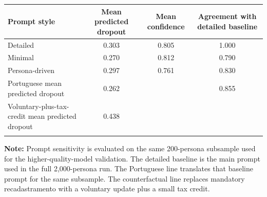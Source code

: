 \begin{tabular*}{\textwidth}{@{\extracolsep{\fill}}lccc}
\doubletoprule
Prompt style & Mean predicted dropout & Mean confidence & Agreement with detailed baseline \\
\midrule
Detailed & 0.303 & 0.805 & 1.000 \\
Minimal & 0.270 & 0.812 & 0.790 \\
Persona-driven & 0.297 & 0.761 & 0.830 \\
\midrule
Portuguese mean predicted dropout & 0.262 &  & 0.855 \\
Voluntary-plus-tax-credit mean predicted dropout & 0.438 &  &  \\
\doublebottomrule
\end{tabular*}

\begin{minipage}{\textwidth}
\footnotesize
\textbf{Note:} Prompt sensitivity is evaluated on the same 200-persona subsample used for the higher-quality-model validation. The detailed baseline is the main prompt used in the full 2,000-persona run. The Portuguese line translates that baseline prompt for the same subsample. The counterfactual line replaces mandatory recadastramento with a voluntary update plus a small tax credit.
\end{minipage}
